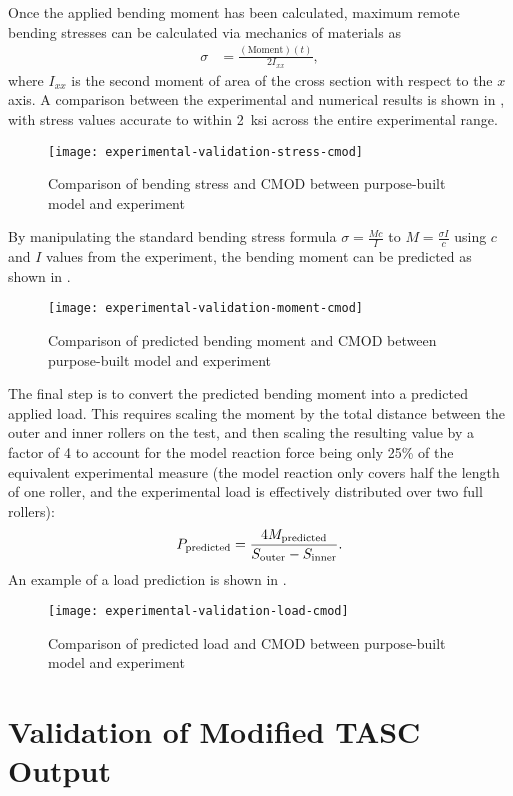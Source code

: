 Once the applied bending moment has been calculated, maximum remote bending stresses can be calculated via mechanics of materials as
\begin{align}
\sigma &= \frac{(\text{Moment})(t)}{2 I_{xx}},
\end{align}
where \(I_{xx}\) is the second moment of area of the cross section with respect to the \(x\) axis.
A comparison between the experimental and numerical results is shown in , with stress values accurate to within 2~ksi across the entire experimental range.
\begin{figure}[tbp]
\centering
\texttt{[image: experimental-validation-stress-cmod]}
\caption{\label{fig:exp_validation_stress_cmod} Comparison of bending stress and CMOD between purpose-built model and experiment}
\end{figure}
By manipulating the standard bending stress formula \(\sigma = \frac{M c}{I}\) to \(M = \frac{\sigma I}{c}\) using \(c\) and \(I\) values from the experiment, the bending moment can be predicted as shown in .
\begin{figure}[tbp]
\centering
\texttt{[image: experimental-validation-moment-cmod]}
\caption{\label{fig:exp_validation_moment_cmod} Comparison of predicted bending moment and CMOD between purpose-built model and experiment}
\end{figure}
The final step is to convert the predicted bending moment into a predicted applied load.
This requires scaling the moment by the total distance between the outer and inner rollers on the test, and then scaling the resulting value by a factor of 4 to account for the model reaction force being only 25\% of the equivalent experimental measure (the model reaction only covers half the length of one roller, and the experimental load is effectively distributed over two full rollers):
\[
P_\text{predicted} = \frac{4 M_\text{predicted}}{S_\textnormal{outer} - S_\textnormal{inner}}.
\]
An example of a load prediction is shown in .
\begin{figure}[tbp]
\centering
\texttt{[image: experimental-validation-load-cmod]}
\caption{\label{fig:exp_validation_load_cmod} Comparison of predicted load and CMOD between purpose-built model and experiment}
\end{figure}

\section{Validation of Modified TASC Output}

